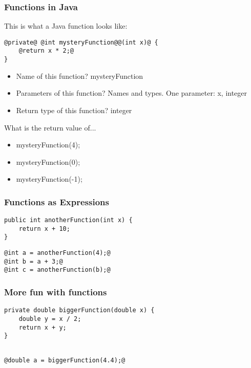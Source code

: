 \documentclass{beamer}
\begin{document}
\begin{frame}[fragile]
\frametitle{Functions in Java}
This is what a Java function looks like:
\begin{lstlisting}[style=base]
@private@ @int mysteryFunction@@(int x)@ {
    @return x * 2;@
}
\end{lstlisting}
\pause
\begin{itemize}
\item Name of this function? \pause mysteryFunction
\pause
\item Parameters of this function? Names and types. \pause \newline One parameter: x, integer
\pause
\item Return type of this function? \pause \newline integer
\end{itemize}
\pause
What is the return value of...
\begin{itemize}
\item mysteryFunction(4);
\pause
\item mysteryFunction(0);
\pause
\item mysteryFunction(-1);
\end{itemize}
\end{frame}


\begin{frame}[fragile]
\frametitle{Functions as Expressions}
\begin{lstlisting}
public int anotherFunction(int x) {
    return x + 10;
}
\end{lstlisting}
\begin{lstlisting}[style=base]
@int a = anotherFunction(4);@
@int b = a + 3;@
@int c = anotherFunction(b);@
\end{lstlisting}

\end{frame}

\begin{frame}[fragile]
\frametitle{More fun with functions}
\begin{lstlisting}
private double biggerFunction(double x) {
    double y = x / 2;
    return x + y;
}
\end{lstlisting}
\begin{lstlisting}[style=base]

@double a = biggerFunction(4.4);@
\end{lstlisting}
\end{frame}
\end{document}
